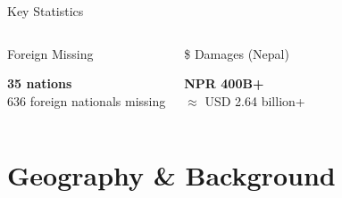 \documentclass[aspectratio=169, 12pt]{beamer}
\begin{document}
\begin{frame}{Key Statistics}
\begin{columns}[c]
			\begin{exampleblock}{Foreign Missing}
				\centering
				\begin{minipage}[c][2.2cm][c]{0.9\linewidth}
					\centering
					\vspace{0pt}
					{\color{rpGold}\bfseries\Large 35 nations}\\[6pt]
					{\small 636 foreign nationals missing}
					\vspace{0pt}
				\end{minipage}
			\end{exampleblock}
			
			\begin{exampleblock}{\$ Damages (Nepal)}
				\centering
				\begin{minipage}[c][2.2cm][c]{0.9\linewidth}
					\centering
					\vspace{0pt}
					{\color{rpGold}\bfseries\Large NPR 400B+}\\[6pt]
					{\small $\approx$ USD 2.64 billion+}
					\vspace{0pt}
				\end{minipage}
			\end{exampleblock}
		\end{columns}
	\end{frame}
	
	\section{Geography \& Background}
	
\end{document}
